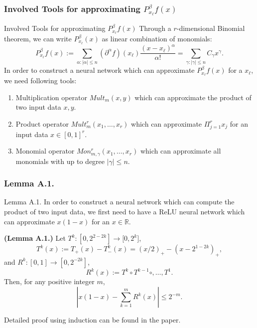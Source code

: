 \documentclass{if-beamer}
\begin{document}
\subsubsection{Involved Tools for approximating $P_{x_{\ell}}^{\beta}f(x)$}
\begin{frame}{Involved Tools for approximating $P_{x_{\ell}}^{\beta}f(x)$}
    Through a $r$-dimensional Binomial theorem, we can write $P^{\beta}_{x_{\ell}}(x)$ as linear combination of monomials: 
    \begin{equation*}
        P_{x_{\ell}}^{\beta}f(x):=\sum_{\alpha:|\alpha|\leq n}(\partial^{\alpha}f)(x_{\ell})\frac{(x-x_{\ell})^{\alpha}}{\alpha!}
        = \sum_{\gamma:|\gamma|\leq n} C_{\gamma}x^{\gamma}.
    \end{equation*}
    In order to construct a neural network which can approximate $P_{x_{\ell}}^{\beta}f(x)$ for a $x_{\ell}$, we need following tools:
    \begin{enumerate}
        \item Multiplication operator $Mult_{m}(x,y)$ which can approximate the product of two input data $x,y$.
        \item Product operator $Mult_{m}^{r}(x_{1},\dots,x_{r})$ which can approximate $\Pi_{j=1}^{r}x_{j}$ for an input data $x\in[0,1]^{r}$.
        \item Monomial operator $Mon_{m,\gamma}^{r}(x_{1},\dots,x_{r})$ which can approximate all monomials with up to degree $|\gamma|\leq n$.
    \end{enumerate}
\end{frame}

\subsubsection{Lemma A.1.}
\begin{frame}{Lemma A.1.}
    In order to construct a neural network which can compute the product of two input data, we first need to have a ReLU neural network which can approximate $x(1-x)$ for an $x\in\mathbb{R}$.
    \begin{tcolorbox}
    \textbf{(Lemma A.1.)}
    Let $T^{k}:[0,2^{2-2k}]\rightarrow{[0,2^{k}}]$,
    \begin{equation*}
        T^{k}(x) := T_{+}(x) - T_{-}^{k}(x) = (x/2)_{+} - (x-2^{1-2k})_{+},
    \end{equation*}
    and $R^{k}:[0,1]\rightarrow{[0,2^{-2k}]}$,
    \begin{equation*}
        R^{k}(x) := T^{k}\circ T^{k-1} \circ, \dots, T^{1}.
    \end{equation*}
    Then, for any positive integer $m$,
    \begin{equation*}
        \left| x(1-x) - \sum_{k=1}^{m} R^{k}(x) \right| \leq 2^{-m}.
    \end{equation*}
    
    \end{tcolorbox}
    
    Detailed proof using induction can be found in the paper. 
\end{frame}
\end{document}
